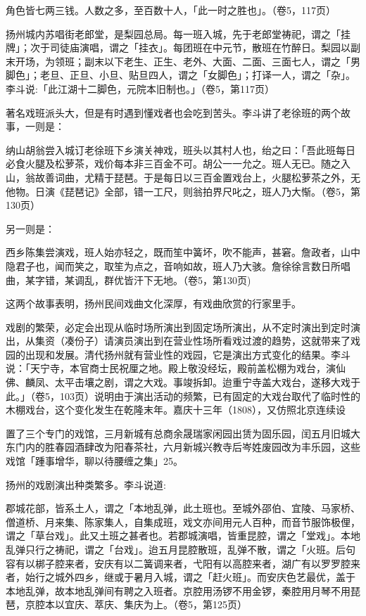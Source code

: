 \noindent 角色皆七两三钱。人数之多，至百数十人，「此一时之胜也」。（卷5，117页）

扬州城内苏唱街老郎堂，是梨园总局。每一班入城，先于老郎堂祷祀，谓之「挂牌」；次于司徒庙演唱，谓之「挂衣」。每团班在中元节，散班在竹醉日。梨园以副末开场，为领班；副末以下老生、正生、老外、大面、二面、三面七人，谓之「男脚色」；老旦、正旦、小旦、贴旦四人，谓之「女脚色」；打译一人，谓之「杂」。李斗说:「此江湖十二脚色，元院本旧制也。」（卷5，第117页）

著名戏班派头大，但是有时遇到懂戏者也会吃到苦头。李斗讲了老徐班的两个故事，一则是：

\begin{BookQuote}
纳山胡翁尝入城订老徐班下乡演关神戏，班头以其村人也，绐之曰：「吾此班每日必食火腿及松萝茶，戏价每本非三百金不可。胡公一一允之。班人无已。随之入山，翁故善词曲，尤精于琵琶。于是每日以三百金置戏台上，火腿松萝茶之外，无他物。日演《琵琶记》全部，错一工尺，则翁拍界尺叱之，班人乃大惭。（卷5，第130页）
\end{BookQuote}

另一则是：

\begin{BookQuote}
西乡陈集尝演戏，班人始亦轻之，既而笙中簧坏，吹不能声，甚窘。詹政者，山中隐君子也，闻而笑之，取笙为点之，音响如故，班人乃大骇。詹徐徐言数日所唱曲，某字错，某调乱，群优皆汗下无地。（卷5，第130页)
\end{BookQuote}

这两个故事表明，扬州民间戏曲文化深厚，有戏曲欣赏的行家里手。

戏剧的繁荣，必定会出现从临时场所演出到固定场所演出，从不定时演出到定时演出，从集资（凑份子）请演员演出到在营业性场所看戏过渡的趋势，这就带来了戏园的出现和发展。清代扬州就有营业性的戏园，它是演出方式变化的结果。李斗说：「天宁寺，本官商士民祝厘之地。殿上敬没经坛，殿前盖松棚为戏台，演仙佛、麟凤、太平击壤之剧，谓之大戏。事竣拆卸。迨重宁寺盖大戏台，遂移大戏于此。」（卷5，103页）说明由于演出活动的频繁，已有固定的大戏台取代了临时性的木棚戏台，这个变化发生在乾隆末年。嘉庆十三年（1808），又仿照北京连续设


\noindent 置了三个专门的戏馆，三月新城有总商余晟瑞家闲园出赁为固乐园，闰五月旧城大东门内的胜春园酒肆改为阳春茶社，六月新城兴教寺后岑姓废园改为丰乐园，这些戏馆「踵事增华，聊以待腰缠之集」25。

扬州的戏剧演出种类繁多。李斗说道:

\begin{BookQuote}
郡城花部，皆系土人，谓之「本地乱弹，此土班也。至城外邵伯、宜陵、马家桥、僧道桥、月来集、陈家集人，自集成班，戏文亦间用元人百种，而音节服饰极俚，谓之「草台戏」。此又土班之甚者也。若郡城演唱，皆重昆腔，谓之「堂戏」。本地乱弹只行之祷祀，谓之「台戏」。迨五月昆腔散班，乱弹不散，谓之「火班。后句容有以梆子腔来者，安庆有以二簧调来者，弋阳有以高腔来者，湖广有以罗罗腔来者，始行之城外四乡，继或于暑月入城，谓之「赶火班」。而安庆色艺最优，盖于本地乱弹，故本地乱弹间有聘之入班者。京腔用汤锣不用金锣，秦腔用月琴不用琵琶，京腔本以宜庆、萃庆、集庆为上。（卷5，第125页）
\end{BookQuote}

